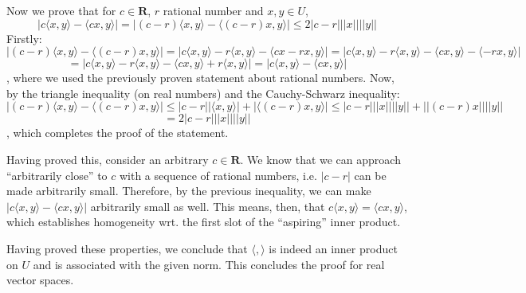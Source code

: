 \begin{solution}
\begin{itemize}
    Now we prove that for $c \in \mathbf{R}$, $r$ rational number and $x, y \in U$,
    $$\lvert c \langle x , y \rangle - \langle cx, y \rangle \rvert = \lvert (c - r)\langle x, y \rangle - \langle (c- r)x, y \rangle \rvert \leq 2\lvert c - r \rvert \lvert \lvert x \rvert \rvert \lvert \lvert y \rvert \rvert$$ 
    Firstly:
    $$\lvert (c - r)\langle x, y \rangle - \langle (c-r)x, y \rangle \rvert = \lvert c\langle x, y \rangle - r\langle x, y \rangle -\langle cx - rx, y \rangle \rvert = \lvert c \langle x, y \rangle - r\langle x, y \rangle - \langle cx, y \rangle - \langle-rx, y\rangle \rvert $$
    $$= \lvert c\langle x, y \rangle - r\langle x, y \rangle -\langle cx, y \rangle + r\langle x, y \rangle \rvert = \lvert c\langle x, y \rangle - \langle cx, y \rangle \rvert$$
    , where we used the previously proven statement about rational numbers.
    Now, by the triangle inequality (on real numbers) and the Cauchy-Schwarz inequality:
    $$\lvert (c - r)\langle x, y \rangle - \langle (c -r)x, y \rangle\rvert \leq \lvert c -r \rvert \lvert \langle x, y \rangle \rvert + \lvert \langle (c-r)x, y \rangle \rvert \leq \lvert c - r \rvert \lvert \lvert x \rvert \rvert \lvert \lvert y \rvert \rvert + \lvert \lvert (c-r)x \rvert \rvert \lvert \lvert y \rvert \rvert$$
    $$ = 2\lvert c -r \rvert \lvert \lvert x \rvert \rvert \lvert \lvert y \rvert \rvert$$
    , which completes the proof of the statement.

    Having proved this, consider an arbitrary $c \in \mathbf{R}$. We know that we can approach ``arbitrarily close'' to $c$ with a sequence of rational numbers, i.e. $\lvert c - r \rvert$ can be made arbitrarily small. Therefore, by the previous inequality, we can make $\lvert c\langle x, y \rangle - \langle cx, y \rangle \rvert$ arbitrarily small as well. This means, then, that $c\langle x, y \rangle = \langle cx, y \rangle$, which establishes homogeneity wrt. the first slot of the ``aspiring'' inner product.

\end{itemize}
Having proved these properties, we conclude that $\langle , \rangle$ is indeed an inner product on $U$ and is associated with the given norm. This concludes the proof for real vector spaces.


\end{solution}
